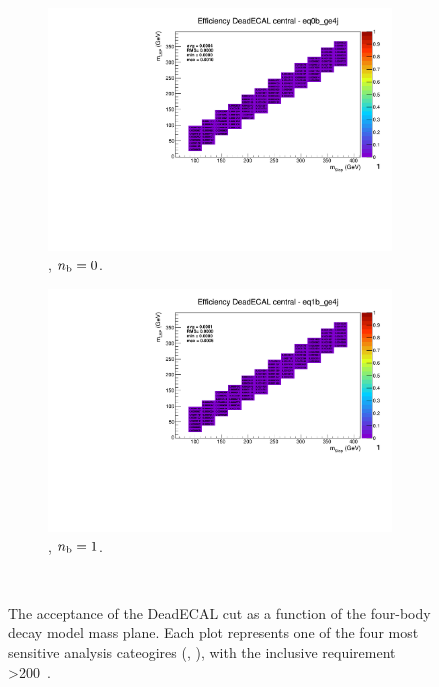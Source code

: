 \begin{figure}[h!]
\begin{subfigure}[b]{0.4\textwidth}
  \end{subfigure}\\
  \begin{subfigure}[b]{0.4\textwidth}
    \includegraphics[width=\textwidth, page=6]{Figs/sms/t2degen/v19_3/systs/T2_4body_DeadECAL_eq0b_ge4j.pdf}
    \caption{\njhigh, $n_{\text{b}} = 0$.}
  \end{subfigure}
  \begin{subfigure}[b]{0.4\textwidth}
    \includegraphics[width=\textwidth, page=6]{Figs/sms/t2degen/v19_3/systs/T2_4body_DeadECAL_eq1b_ge4j.pdf}
    \caption{\njhigh, $n_{\text{b}} = 1$.}
  \end{subfigure}\\
  \caption{The acceptance of the DeadECAL cut as a function of the four-body
  decay model
  mass plane. Each plot represents one of the four most sensitive 
  analysis cateogires (\nb, \nj), with the inclusive requirement \HT>200~\gev.}
  \label{fig:sms-deadecal-t2degen}
\end{figure}

